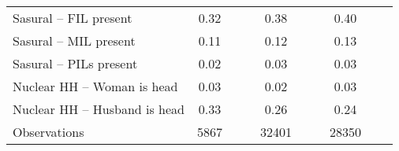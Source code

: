 {\begin{tabular}{l*{3}{ccc}}
Sasural – FIL present&        0.32&            &            &        0.38&            &            &        0.40&            &            \\
Sasural – MIL present&        0.11&            &            &        0.12&            &            &        0.13&            &            \\
Sasural – PILs present&        0.02&            &            &        0.03&            &            &        0.03&            &            \\
Nuclear HH – Woman is head&        0.03&            &            &        0.02&            &            &        0.03&            &            \\
Nuclear HH – Husband is head&        0.33&            &            &        0.26&            &            &        0.24&            &            \\
\hline
Observations        &        5867&            &            &       32401&            &            &       28350&            &            \\
\hline\hline
\end{tabular}
}
